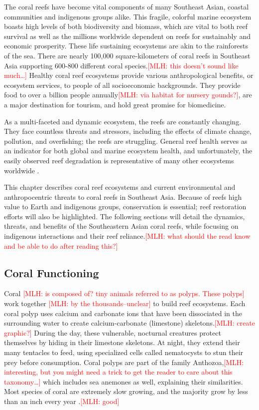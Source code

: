 \documentclass{book}\usepackage{knitr}
\newcommand{\red}[1]{\textcolor{red}{[MLH: #1]}}
\begin{document}
{The coral reefs have become vital components of many Southeast Asian, coastal communities and indigenous groups alike. This fragile, colorful marine ecosystem boasts high levels of both biodiversity and biomass, which are vital to both reef survival as well as the millions worldwide dependent on reefs for sustainably and economic prosperity. These life sustaining ecosystems are akin to the rainforests of the sea. There are nearly 100,000 square-kilometers of coral reefs in Southeast Asia supporting 600-800 different coral species.\red{this doesn't sound like much\ldots} Healthy coral reef ecosystems provide various anthropological benefits, or ecosystem services, to people of all socioeconomic backgrounds. They provide food to over a billion people annually\red{via habitat for nursery gounds?}, are a major destination for tourism, and hold great promise for biomedicine. 

As a multi-faceted and dynamic ecosystem, the reefs are constantly changing. They face countless threats and stressors, including the effects of climate change, pollution, and overfishing; the reefs are struggling. General reef health serves as an indicator for both global and marine ecosystem health, and unfortunately, the easily observed reef degradation is representative of many other ecosystems worldwide \citep{RAR}.

This chapter describes coral reef ecosystems and current environmental and anthropocentric threats to coral reefs in Southeast Asia.  Because of reefs high value to Earth and indigenous groups, conservation is essential; reef restoration efforts will also be highlighted. The following sections will detail the dynamics, threats, and benefits of the Southeastern Asian coral reefs, while focusing on indigenous interactions and their reef reliance.\red{what should the read know and be able to do after reading this?}

\subsection{Coral Functioning}

Coral \red{is composed of? tiny animals referred to as polyps. These polyps} work together \red{by the thousands--unclear} to build reef ecosystems. Each coral polyp uses calcium and carbonate ions that have been dissociated in the surrounding water to create calcium-carbonate (limestone) skeletons.\red{create graphic?} During the day, these vulnerable, nocturnal creatures protect themselves by hiding in their limestone skeletons. At night, they extend their many tentacles to feed, using specialized cells called nematocysts to stun their prey before consumption. Coral polyps are part of the family Anthozoa,\red{interesting, but you might need a trick to get the reader to care about this taxonomy\ldots} which includes sea anemones as well, explaining their similarities. Most species of coral are extremely slow growing, and the majority grow by less than an inch every year \citep{coralreefalliance_2021}.\red{good}

}
\end{document}
